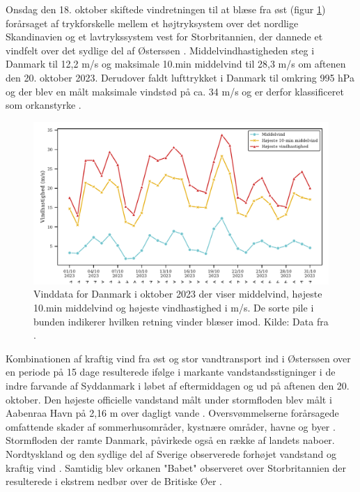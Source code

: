 Onsdag den 18. oktober skiftede vindretningen til at blæse fra øst (figur \ref{Figur: Vinddata Danmark}) forårsaget af trykforskelle mellem et højtryksystem over det nordlige Skandinavien og et lavtrykssystem vest for Storbritannien, der dannede et vindfelt over det sydlige del af Østersøen \citep{kiesel_brief_2024}. Middelvindhastigheden steg i Danmark til 12,2 m/s og maksimale 10.min middelvind til 28,3 m/s om aftenen den 20. oktober 2023. Derudover faldt lufttrykket i Danmark til omkring 995 hPa og der blev en målt maksimale vindstød på ca. 34 m/s og er derfor klassificeret som orkanstyrke \citep{dmi_vejrarkiv}. 
\begin{figure} [H]
    \centering
    \includegraphics[width=0.9\linewidth]{images/teori/vinddata_grafer/Danmark_vinddata.pdf}
    \caption{Vinddata for Danmark i oktober 2023 der viser middelvind, højeste 10.min middelvind og højeste vindhastighed i m/s. De sorte pile i bunden indikerer hvilken retning vinder blæser imod. Kilde: Data fra \cite{dmi_vejrarkiv}.}
    \label{Figur: Vinddata Danmark}
\end{figure}

Kombinationen af kraftig vind fra øst og stor vandtransport ind i Østersøen over en periode på 15 dage resulterede ifølge \cite{kystdirektoratet_stormflod2023} i markante vandstandsstigninger i de indre farvande af Syddanmark i løbet af eftermiddagen og ud på aftenen den 20. oktober. Den højeste officielle vandstand målt under stormfloden blev målt i Aabenraa Havn på 2,16 m over dagligt vande \citep{damberg_vaerste_2023}. Oversvømmelserne forårsagede omfattende skader af sommerhusområder, kystnære områder, havne og byer \citep{kystdirektoratet_stormflod2023, naturskaderadet_anmeldelser_2023}. \\
Stormfloden der ramte Danmark, påvirkede også en række af landets naboer. Nordtyskland og den sydlige del af Sverige observerede forhøjet vandstand og kraftig vind \citep{kiesel_brief_2024}. Samtidig blev orkanen "Babet"\hspace{0.1cm} observeret over Storbritannien der resulterede i ekstrem nedbør over de Britiske Øer \citep{met_office_storm_2023}.  




